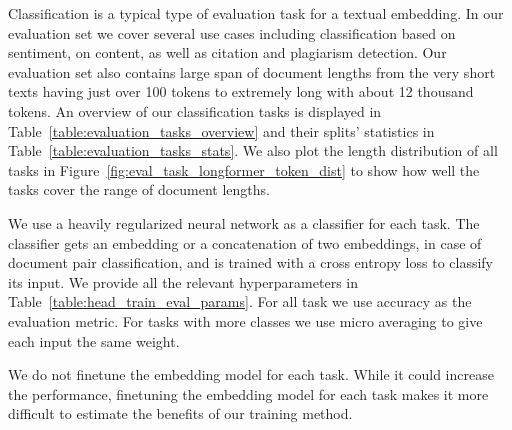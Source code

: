 Classification is a typical type of evaluation task for a textual embedding. In
our evaluation set we cover several use cases including classification based on
sentiment, on content, as well as citation and plagiarism detection. Our
evaluation set also contains large span of document lengths from the very short
texts having just over 100 tokens to extremely long with about 12 thousand
tokens. An overview of our classification tasks is displayed in
Table~\ref{table:evaluation_tasks_overview} and their splits' statistics in
Table~\ref{table:evaluation_tasks_stats}. We also plot the length distribution
of all tasks in Figure~\ref{fig:eval_task_longformer_token_dist} to show how
well the tasks cover the range of document lengths.

We use a heavily regularized neural network as a classifier for each task. The
classifier gets an embedding or a concatenation of two embeddings, in case of
document pair classification, and is trained with a cross entropy loss to
classify its input. We provide all the relevant hyperparameters in
Table~\ref{table:head_train_eval_params}. For all task we use accuracy as the
evaluation metric. For tasks with more classes we use micro averaging to give
each input the same weight.

We do not finetune the embedding model for each task. While it could increase
the performance, finetuning the embedding model for each task makes it more
difficult to estimate the benefits of our training method.


